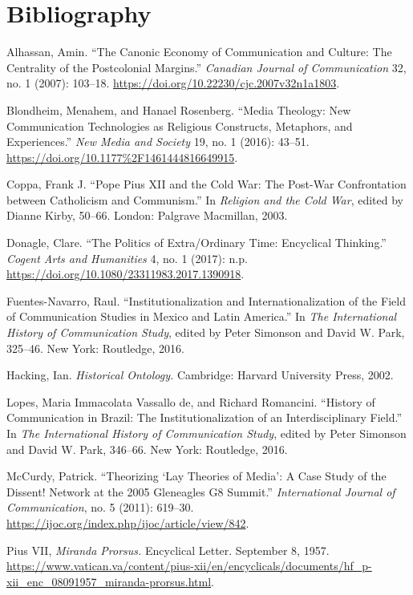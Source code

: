 \documentclass{tufte-handout}
\begin{document}
\section{Bibliography}\label{bibliography}

\begin{hangparas}{.25in}{1} 



Alhassan, Amin. ``The Canonic Economy of Communication and Culture: The
Centrality of the Postcolonial Margins.'' \emph{Canadian Journal of
Communication} 32, no. 1 (2007): 103­--18.
\url{https://doi.org/10.22230/cjc.2007v32n1a1803}.

Blondheim, Menahem, and Hanael Rosenberg. ``Media Theology: New
Communication Technologies as Religious Constructs, Metaphors, and
Experiences.'' \emph{New Media and Society} 19, no. 1 (2016): 43--51.
\url{https://doi.org/10.1177\%2F1461444816649915}.

Coppa, Frank J. ``Pope Pius XII and the Cold War: The Post-War
Confrontation between Catholicism and Communism.'' In \emph{Religion and
the Cold War}, edited by Dianne Kirby, 50--66. London: Palgrave
Macmillan, 2003.

Donagle, Clare. ``The Politics of Extra/Ordinary Time: Encyclical
Thinking.'' \emph{Cogent Arts and Humanities} 4, no. 1 (2017): n.p.
\url{https://doi.org/10.1080/23311983.2017.1390918}.

Fuentes-Navarro, Raul. ``Institutionalization and Internationalization
of the Field of Communication Studies in Mexico and Latin America.'' In
\emph{The International History of Communication Study}, edited by Peter
Simonson and David W. Park, 325--46. New York: Routledge, 2016.

Hacking, Ian. \emph{Historical Ontology.} Cambridge: Harvard University
Press, 2002.

Lopes, Maria Immacolata Vassallo de, and Richard Romancini. ``History of
Communication in Brazil: The Institutionalization of an
Interdisciplinary Field.'' In \emph{The International History of
Communication Study}, edited by Peter Simonson and David W. Park,
346--66. New York: Routledge, 2016.

McCurdy, Patrick. ``Theorizing `Lay Theories of Media': A Case Study of
the Dissent! Network at the 2005 Gleneagles G8 Summit.''
\emph{International Journal of Communication}, no. 5 (2011): 619--30.
\url{https://ijoc.org/index.php/ijoc/article/view/842}.

Pius VII, \emph{Miranda Prorsus.} Encyclical Letter. September 8, 1957.
\url{https://www.vatican.va/content/pius-xii/en/encyclicals/documents/hf_p-xii_enc_08091957_miranda-prorsus.html}.


\end{hangparas}
\end{document}
